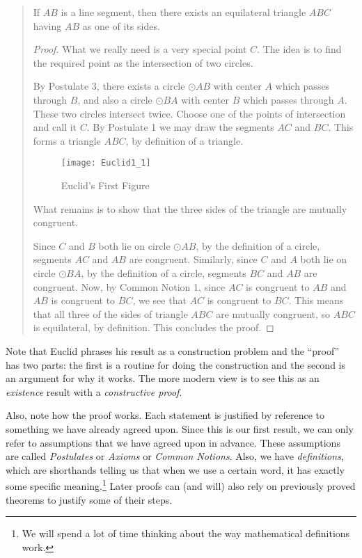 \begin{quotation}
\begin{unthm}
If $AB$ is a line segment, then there exists an equilateral triangle $ABC$ having $AB$ as one of its sides.
\end{unthm}

\begin{proof}
What we really need is a very special point $C$.
The idea is to find the required point as the intersection of two circles.

By Postulate 3, there exists a circle $\odot AB$ with center $A$ which passes through $B$, and also a circle $\odot BA$ with center $B$ which passes through $A$.
These two circles intersect twice.
Choose one of the points of intersection and call it $C$.
By Postulate 1 we may draw the segments $AC$ and $BC$.
This forms a triangle $ABC$, by definition of a triangle.
\begin{figure}[h]
	\centering
    \texttt{[image: Euclid1\_1]}
    \caption{Euclid's First Figure}
\end{figure}
What remains is to show that the three sides of the triangle are mutually congruent.

Since $C$ and $B$ both lie on circle $\odot AB$, by the definition of a circle, segments $AC$ and $AB$ are congruent.
Similarly, since $C$ and $A$ both lie on circle $\odot BA$, by the definition of a circle, segments $BC$ and $AB$ are congruent.
Now, by Common Notion 1, since $AC$ is congruent to $AB$ and $AB$ is congruent to $BC$, we see that $AC$ is congruent to $BC$.
This means that all three of the sides of triangle $ABC$ are mutually congruent, so $ABC$ is equilateral, by definition.
This concludes the proof.
\end{proof}
\end{quotation}

Note that Euclid phrases his result as a construction problem and the ``proof'' has two parts: the first is a routine for doing the construction and the second is an argument for why it works.
The more modern view is to see this as an \emph{existence} result with a \emph{constructive proof}.



Also, note how the proof works.
Each statement is justified by reference to something we have already agreed upon.
Since this is our first result, we can only refer to assumptions that we have agreed upon in advance.
These assumptions are called \emph{Postulates} or \emph{Axioms} or \emph{Common Notions}.
Also, we have \emph{definitions}, which are shorthands telling us that when we use a certain word, it has exactly some specific meaning.\footnote{We will spend a lot of time thinking about the way mathematical definitions work.}
Later proofs can (and will) also rely on previously proved theorems to justify some of their steps.

